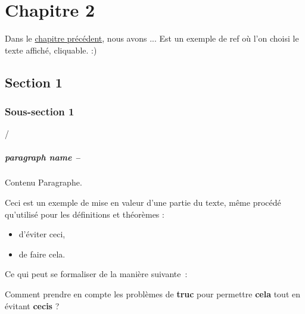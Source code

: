 \documentclass[french, a4paper, 11pt, twoside, pdftex]{StyleThese}
\begin{document}
\setcounter{chapter}{2} %
\dominitoc
\faketableofcontents
\fi

\chapter{Chapitre 2} \label{chap:2_StateofArt}
\minitoc

Dans le \hyperref[chap:1_EnjeuxIntro]{chapitre précédent}, nous avons ... Est un exemple de ref où l'on choisi le texte affiché, cliquable. :)

\section{Section 1}
    \subsection{Sous-section 1}


  /\paragraph{paragraph name --}
   Contenu Paragraphe.

  Ceci est un exemple de mise en valeur d'une partie du texte, même procédé qu'utilisé pour les définitions et théorèmes :
   \begin{itemize}
   	\item 	d'éviter ceci,
   	\item   de faire cela.
   \end{itemize}
	Ce qui peut se formaliser de la manière suivante~:
	\begin{mdframed}[outerlinewidth=1.5pt,
	innerlinewidth=1.5pt,
	middlelinewidth=2pt,
	middlelinecolor=white,
	bottomline=false,topline=false,rightline=false]
	Comment prendre en compte les problèmes de \textbf{truc} pour permettre \textbf{cela} tout en évitant \textbf{cecis} ?
\end{mdframed}
\end{document}
